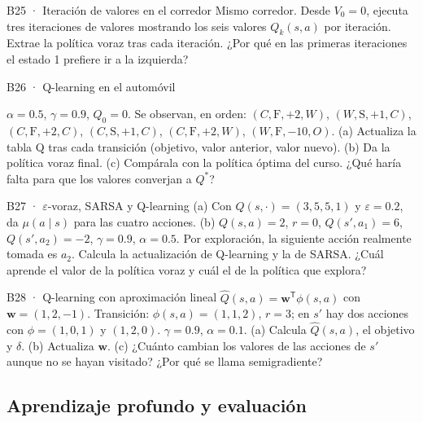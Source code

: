 \begin{ejercicio}{B25 · Iteración de valores en el corredor }
Mismo corredor. Desde $V_0=0$, ejecuta tres iteraciones de valores mostrando los seis valores $Q_k(s,a)$ por iteración.
Extrae la política voraz tras cada iteración. ¿Por qué en las primeras iteraciones el estado 1 prefiere ir a la izquierda?
\end{ejercicio}

\begin{ejercicio}{B26 · Q-learning en el automóvil }
\begin{center}\tabAuto\end{center}
$\alpha=0.5$, $\gamma=0.9$, $Q_0=0$. Se observan, en orden:
$(C,\text{F},+2,W)$, $(W,\text{S},+1,C)$, $(C,\text{F},+2,C)$, $(C,\text{S},+1,C)$, $(C,\text{F},+2,W)$, $(W,\text{F},-10,O)$.
(a) Actualiza la tabla Q tras cada transición (objetivo, valor anterior, valor nuevo). (b) Da la política voraz final.
(c) Compárala con la política óptima del curso. ¿Qué haría falta para que los valores converjan a $Q^*$?
\end{ejercicio}

\begin{ejercicio}{B27 · $\varepsilon$-voraz, SARSA y Q-learning }
(a) Con $Q(s,\cdot)=(3,5,5,1)$ y $\varepsilon=0.2$, da $\mu(a\mid s)$ para las cuatro acciones.
(b) $Q(s,a)=2$, $r=0$, $Q(s',a_1)=6$, $Q(s',a_2)=-2$, $\gamma=0.9$, $\alpha=0.5$. Por exploración, la siguiente acción
realmente tomada es $a_2$. Calcula la actualización de Q-learning y la de SARSA. ¿Cuál aprende el valor de la política
voraz y cuál el de la política que explora?
\end{ejercicio}

\begin{ejercicio}{B28 · Q-learning con aproximación lineal }
$\hat Q(s,a)=\mathbf w^\mathsf T\phi(s,a)$ con $\mathbf w=(1,2,-1)$. Transición: $\phi(s,a)=(1,1,2)$, $r=3$; en $s'$ hay dos
acciones con $\phi=(1,0,1)$ y $(1,2,0)$. $\gamma=0.9$, $\alpha=0.1$.
(a) Calcula $\hat Q(s,a)$, el objetivo y $\delta$. (b) Actualiza $\mathbf w$. (c) ¿Cuánto cambian los valores de las acciones
de $s'$ aunque no se hayan visitado? ¿Por qué se llama semigradiente?
\end{ejercicio}

\subsection{Aprendizaje profundo y evaluación}

